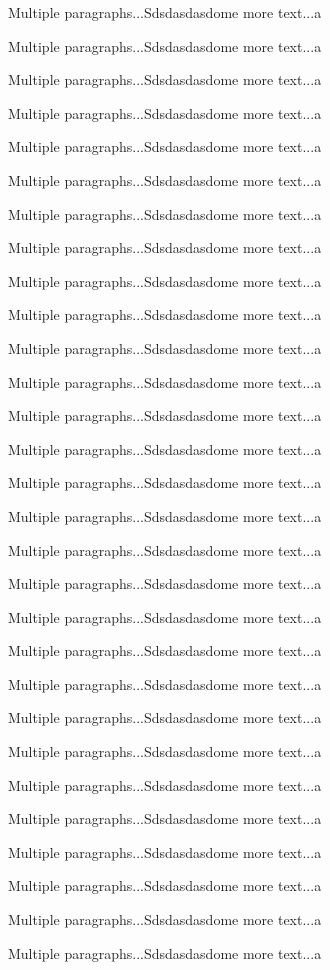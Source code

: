 \documentclass[doublespace,endnotes]{lingpaper}
\begin{document}
Multiple paragraphs...Sdsdasdasdome more text...a

Multiple paragraphs...Sdsdasdasdome more text...a

Multiple paragraphs...Sdsdasdasdome more text...a

Multiple paragraphs...Sdsdasdasdome more text...a

Multiple paragraphs...Sdsdasdasdome more text...a

Multiple paragraphs...Sdsdasdasdome more text...a

Multiple paragraphs...Sdsdasdasdome more text...a

Multiple paragraphs...Sdsdasdasdome more text...a

Multiple paragraphs...Sdsdasdasdome more text...a

Multiple paragraphs...Sdsdasdasdome more text...a

Multiple paragraphs...Sdsdasdasdome more text...a

Multiple paragraphs...Sdsdasdasdome more text...a

Multiple paragraphs...Sdsdasdasdome more text...a

Multiple paragraphs...Sdsdasdasdome more text...a

Multiple paragraphs...Sdsdasdasdome more text...a

Multiple paragraphs...Sdsdasdasdome more text...a

Multiple paragraphs...Sdsdasdasdome more text...a

Multiple paragraphs...Sdsdasdasdome more text...a

Multiple paragraphs...Sdsdasdasdome more text...a

Multiple paragraphs...Sdsdasdasdome more text...a

Multiple paragraphs...Sdsdasdasdome more text...a

Multiple paragraphs...Sdsdasdasdome more text...a

Multiple paragraphs...Sdsdasdasdome more text...a

Multiple paragraphs...Sdsdasdasdome more text...a

Multiple paragraphs...Sdsdasdasdome more text...a

Multiple paragraphs...Sdsdasdasdome more text...a

Multiple paragraphs...Sdsdasdasdome more text...a

Multiple paragraphs...Sdsdasdasdome more text...a

Multiple paragraphs...Sdsdasdasdome more text...a
\end{document}
